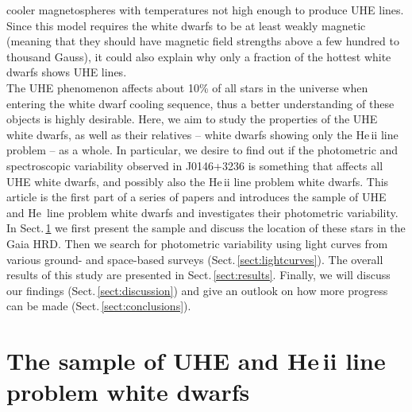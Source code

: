 \documentclass{aa}
\newcounter{Rco}
\newcommand{\Ionst}[1]{\setcounter{Rco}{#1}\Roman{Rco}}
\newcommand{\Ion}[2]{\mbox{#1\,{\scriptsize\Ionst{#2}}}}
\newcommand{\se}[1]{\mbox{Sect.\,\ref{#1}}}
\begin{document}
cooler magnetospheres with temperatures not high enough to produce UHE lines.
Since this model requires the white dwarfs to be at least weakly magnetic
(meaning that they should have magnetic field strengths above a few hundred to
thousand Gauss), it could also explain why only a fraction of the hottest white
dwarfs shows UHE lines.\\
The UHE phenomenon affects about 10\% of all stars in the
universe when entering the white dwarf cooling sequence, thus a better
understanding of these objects is highly desirable. Here, we aim to study
the properties of the UHE white dwarfs, as well as their relatives
-- white dwarfs showing only the He\,{\sc ii} line problem -- as a whole. In
particular, we desire to find out if the photometric and
spectroscopic variability observed in J0146+3236 is something that affects all
UHE white dwarfs, and possibly also the He\,{\sc ii} line problem white dwarfs.
This article is the first part of a series of papers and introduces the sample
of UHE and \Ion{He}{2} line problem white dwarfs and investigates their
photometric variability. In \se{sect:sample} we first present the sample
and discuss the location of these stars in the Gaia HRD. Then we search for
photometric variability using light curves from various ground- and space-based
surveys (\se{sect:lightcurves}). The overall results of this study are
presented in \se{sect:results}. Finally, we will discuss our findings
(\se{sect:discussion}) and give an outlook on how more progress can be made
(\se{sect:conclusions}).
 
\section{The sample of UHE and He\,{\sc ii} line problem white dwarfs}
\label{sect:sample}
\end{document}
